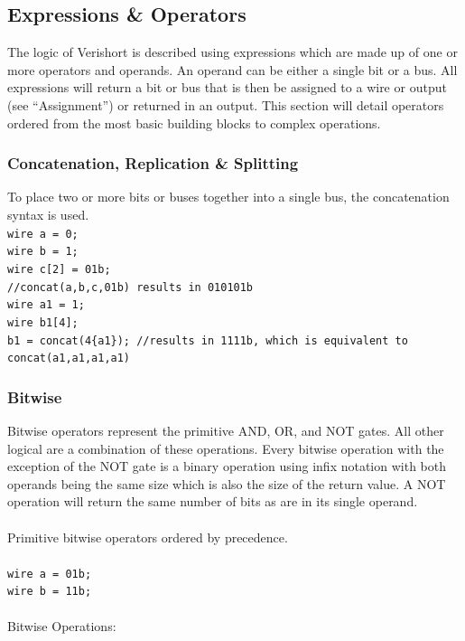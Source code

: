 \documentclass[letterpaper,11pt]{article}
\begin{document}
    \subsection{Expressions \& Operators}
    The logic of Verishort is described using expressions which are made up of one 
    or more operators and operands. An operand can be either a single bit or a bus. 
    All expressions will return a bit or bus that is then be assigned to a wire or output 
    (see ``Assignment'') or returned in an output. This section will detail operators ordered from the 
    most basic building blocks to complex operations.
    
        \subsubsection{Concatenation, Replication \& Splitting}
        To place two or more bits or buses together into a single bus, the concatenation syntax is used. \\
        \texttt{wire a = 0;} \\
        \texttt{wire b = 1;} \\
        \texttt{wire c[2] = 01b;} \\
        \texttt{//concat(a,b,c,01b) results in 010101b} \\
        \texttt{wire a1 = 1;} \\
        \texttt{wire b1[4];} \\
        \texttt{b1 = concat(4\{a1\}); \slash\slash results in 1111b, which is equivalent to concat(a1,a1,a1,a1)} \\
        
        \subsubsection{Bitwise}
        Bitwise operators represent the primitive AND, OR, and NOT gates. All other logical are a combination 
        of these operations. Every bitwise operation with the exception of the NOT gate is a binary operation 
        using infix notation with both operands being the same size which is also the 
        size of the return value. A NOT operation will return the same number of bits as are in its single operand. \\\\
        Primitive bitwise operators ordered by precedence. \\\\
        \texttt{wire a = 01b;} \\
        \texttt{wire b = 11b;} \\\\
        Bitwise Operations: \\
        
\end{document}
